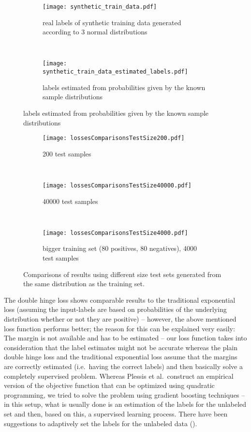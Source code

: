 \begin{figure}[ht]
	\centering
	\begin{subfigure}[h]{0.45\textwidth}
	\texttt{[image: synthetic\_train\_data.pdf]}	
		\caption*{real labels of synthetic training data generated according to 3 normal distributions}
	\end{subfigure}
	~
	\begin{subfigure}[h]{0.45\textwidth}
	\texttt{[image: synthetic\_train\_data\_estimated\_labels.pdf]}	
		\caption*{labels estimated from probabilities given by the known sample distributions}
	\end{subfigure}
	\label{fig:synthetic_train_data}
\end{figure}

\begin{figure}[ht]
	\centering
	\begin{subfigure}[h]{0.45\textwidth}
	\texttt{[image: lossesComparisonsTestSize200.pdf]}	
		\caption*{200 test samples}
	\end{subfigure}
	~
	\begin{subfigure}[h]{0.45\textwidth}
	\texttt{[image: lossesComparisonsTestSize40000.pdf]}	
		\caption*{40000 test samples}
	\end{subfigure}
	~
	\begin{subfigure}[h]{\textwidth}
	\texttt{[image: lossesComparisonsTestSize4000.pdf]}	
		\caption*{bigger training set (80 positives, 80 negatives), 4000 test samples}
	\end{subfigure}
	\caption{Comparisons of results using different size test sets generated from the same distribution as the training set. }
	\label{fig:loss-functions-comparisons}
\end{figure}

The double hinge loss shows comparable results to the traditional exponential loss (assuming the input-labels are based on probabilities of the underlying distribution whether or not they are positive) -- however, the above mentioned loss function performs better; the reason for this can be explained very easily: The margin is not available and has to be estimated -- our loss function takes into consideration that the label estimates might not be accurate whereas the plain double hinge loss and the traditional exponential loss assume that the margins are correctly estimated (i.e.\ having the correct labels) and then basically solve a completely supervised problem. Whereas Plessis et al.\ construct an empirical version of the objective function that can be optimized using quadratic programming, we tried to solve the problem using gradient boosting techniques -- in this setup, what is usually done is an estimation of the labels for the unlabeled set and then, based on this, a supervised learning process. There have been suggestions to adaptively set the labels for the unlabeled data (). 

